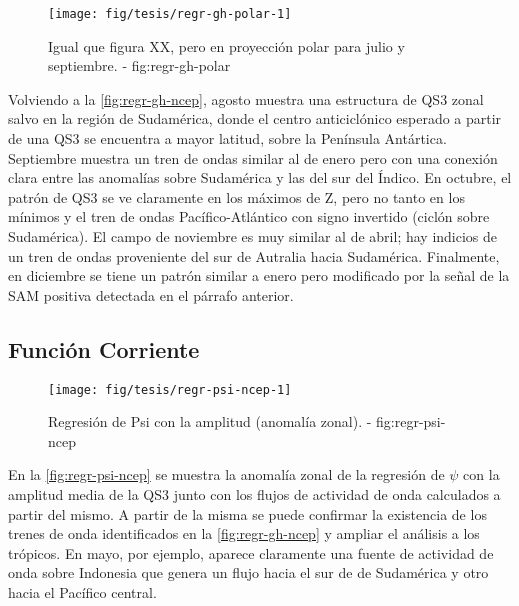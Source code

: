 \documentclass[spanish,a4paper,12p]{book}
\begin{document}
\begin{figure*}
\texttt{[image: fig/tesis/regr-gh-polar-1]} \caption{Igual que figura  XX, pero en proyección polar para julio y septiembre. - fig:regr-gh-polar}\label{fig:regr-gh-polar}
\end{figure*}

Volviendo a la \autoref{fig:regr-gh-ncep}, agosto muestra una estructura
de QS3 zonal salvo en la región de Sudamérica, donde el centro
anticiclónico esperado a partir de una QS3 se encuentra a mayor latitud,
sobre la Península Antártica. Septiembre muestra un tren de ondas
similar al de enero pero con una conexión clara entre las anomalías
sobre Sudamérica y las del sur del Índico. En
octubre, el patrón de QS3 se ve claramente en los máximos de Z, pero no
tanto en los mínimos y el tren de ondas Pacífico-Atlántico con signo
invertido (ciclón sobre Sudamérica). El campo de noviembre es muy
similar al de abril; hay indicios de un tren de ondas proveniente del
sur de Autralia hacia Sudamérica. Finalmente, en diciembre se tiene un
patrón similar a enero pero modificado por la señal de la SAM positiva
detectada en el párrafo anterior.

\subsection{Función Corriente}\label{funcion-corriente-1}

\begin{landscape}\begin{figure}

{\centering \texttt{[image: fig/tesis/regr-psi-ncep-1]} 

}

\caption{Regresión de Psi con la amplitud (anomalía zonal). - fig:regr-psi-ncep}\label{fig:regr-psi-ncep}
\end{figure}
\end{landscape}

En la \autoref{fig:regr-psi-ncep} se muestra la anomalía zonal de la
regresión de \(\psi\) con la amplitud media de la QS3 junto con los
flujos de actividad de onda calculados a partir del mismo. A partir de
la misma se puede confirmar la existencia de los trenes de onda
identificados en la \autoref{fig:regr-gh-ncep} y ampliar el análisis a
los trópicos. En mayo, por ejemplo, aparece claramente una fuente de
actividad de onda sobre Indonesia que genera un flujo hacia el sur de de
Sudamérica y otro hacia el Pacífico central.
\end{document}
